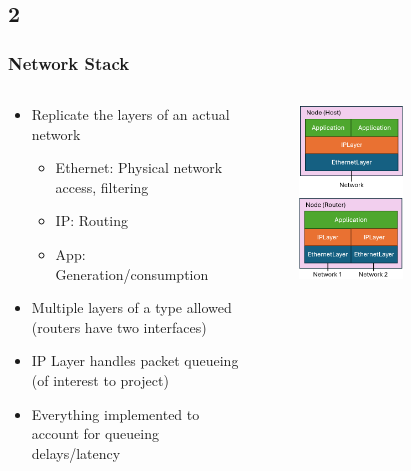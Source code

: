 \documentclass[compress]{beamer}
\begin{document}
    \subsection{2}
    \begin{frame}
        \frametitle{Network Stack}
        \begin{columns}
            \begin{column}{0.5\textwidth}
                \begin{itemize}
                    \item Replicate the layers of an actual network
                    \begin{itemize}
                        \item Ethernet: Physical network access, filtering
                        \item IP: Routing
                        \item App: Generation/consumption
                    \end{itemize}
                    \item Multiple layers of a type allowed (routers have two interfaces)
                    \item IP Layer handles packet queueing (of interest to project)
                    \item Everything implemented to account for queueing delays/latency
                \end{itemize}
            \end{column}

            \begin{column}{0.5\textwidth}
                \begin{figure}
                    \centering
                    \includegraphics[width=0.6\textwidth]{../img/combo}
                \end{figure}
            \end{column}
        \end{columns}
    \end{frame}
\end{document}

